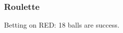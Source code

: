 \documentclass[handout]{beamer}
\begin{document}


   \begin{frame}
   \frametitle{Roulette}
   \begin{center}
   \end{center}
   Betting on {\color{red} RED}: 18 balls are success.
   \end{frame}

\end{document}
